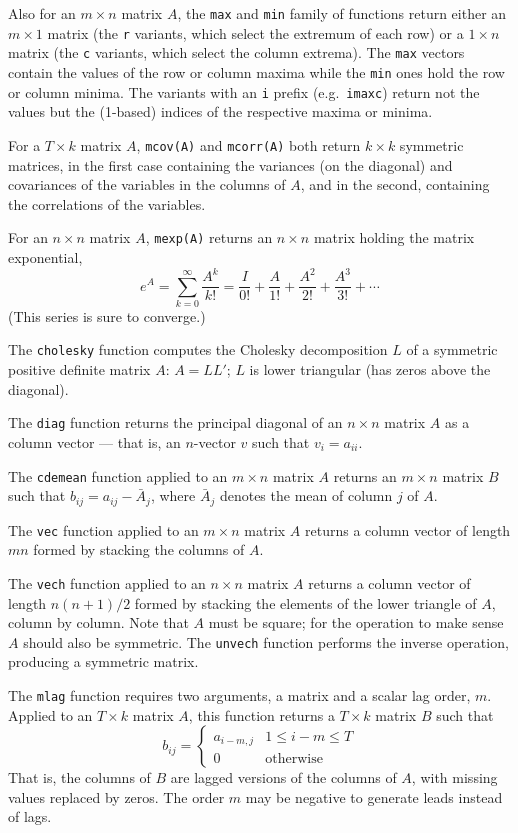 Also for an $m \times n$ matrix $A$, the \texttt{max} and \texttt{min}
family of functions return either an $m \times 1$ matrix (the
\texttt{r} variants, which select the extremum of each row) or a $1
\times n$ matrix (the \texttt{c} variants, which select the column
extrema).  The \texttt{max} vectors contain the values of the row or
column maxima while the \texttt{min} ones hold the row or column
minima.  The variants with an \texttt{i} prefix (e.g.\ \texttt{imaxc})
return not the values but the (1-based) indices of the respective
maxima or minima.

For a $T \times k$ matrix $A$, \texttt{mcov(A)} and \texttt{mcorr(A)}
both return $k \times k$ symmetric matrices, in the first case
containing the variances (on the diagonal) and covariances of the
variables in the columns of $A$, and in the second, containing the
correlations of the variables.

For an $n \times n$ matrix $A$, \texttt{mexp(A)} returns an $n \times
n$ matrix holding the matrix exponential,
\[
e^A = \sum_{k=0}^{\infty} \frac{A^k}{k!} = \frac{I}{0!} + \frac{A}{1!}
 + \frac{A^2}{2!} + \frac{A^3}{3!} + \cdots
\]
(This series is sure to converge.)

The \texttt{cholesky} function computes the Cholesky decomposition $L$
of a symmetric positive definite matrix $A$: $A = LL'$; $L$ is lower
triangular (has zeros above the diagonal).  

The \texttt{diag} function returns the principal diagonal of an
$n\times n$ matrix $A$ as a column vector --- that is, an
$n$-vector $v$ such that $v_i = a_{ii}$.

The \texttt{cdemean} function applied to an $m \times n$ matrix $A$
returns an $m \times n$ matrix $B$ such that $b_{ij} = a_{ij} -
\bar{A}_j$, where $\bar{A}_j$ denotes the mean of column $j$ of $A$.  

The \texttt{vec} function applied to an $m \times n$ matrix $A$
returns a column vector of length $mn$ formed by stacking the columns
of $A$.  

The \texttt{vech} function applied to an $n \times n$ matrix $A$
returns a column vector of length $n(n+1)/2$ formed by stacking the
elements of the lower triangle of $A$, column by column.  Note that
$A$ must be square; for the operation to make sense $A$ should also
be symmetric.  The \texttt{unvech} function performs the inverse
operation, producing a symmetric matrix.

The \texttt{mlag} function requires two arguments, a matrix and a
scalar lag order, $m$.  Applied to an $T \times k$ matrix $A$, this
function returns a $T \times k$ matrix $B$ such that
%
\[
  b_{ij} = \left\{ 
    \begin{array}{ll} 
      a_{i-m,j} & 1 \leq i - m \leq T \\ 
      0 & \mbox{otherwise}
    \end{array}
    \right.
\]
%
That is, the columns of $B$ are lagged versions of the columns of $A$,
with missing values replaced by zeros.  The order $m$ may be negative
to generate leads instead of lags.

